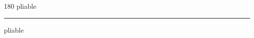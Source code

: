 
\begin{frame}
\begin{center}
\begin{turn}{180}
{\fontsize{2.5cm}{1em}\selectfont pliable}
\end{turn}
\vspace{1em}\par  
\hrule
\vspace{1em}\par  
{\fontsize{2.5cm}{1em}\selectfont pliable}
\end{center}
\end{frame}
